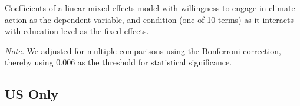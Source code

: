 \begin{table}[H] 
\caption{Coefficients of a linear mixed effects model with willingness to engage in climate action as the dependent variable, and condition (one of 10 terms) as it interacts with education level as the fixed effects. }
 
\end{table}
\textit{Note.} We adjusted for multiple comparisons using the Bonferroni correction, thereby using 0.006 as the threshold for statistical significance.

  \subsection{US Only}
